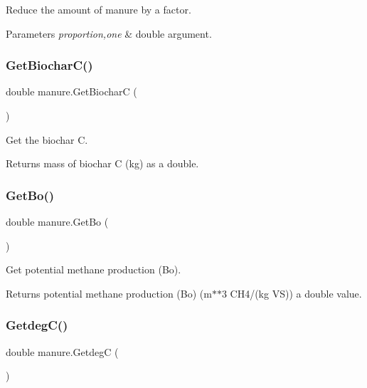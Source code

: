Reduce the amount of manure by a factor. 


\begin{DoxyParams}{Parameters}
{\em proportion,one} & double argument. \\
\hline
\end{DoxyParams}
\mbox{\label{classmanure_a022ab5816bf0c566ce47f71641834531}} 
\subsubsection{\texorpdfstring{GetBiocharC()}{GetBiocharC()}}
{\footnotesize\ttfamily double manure.\+Get\+BiocharC (\begin{DoxyParamCaption}{ }\end{DoxyParamCaption})\hspace{0.3cm}{\ttfamily [inline]}}



Get the biochar C. 

\begin{DoxyReturn}{Returns}
mass of biochar C (kg) as a double. 
\end{DoxyReturn}
\mbox{\label{classmanure_ab7c3b9e8a727966f4d99548a98ae6f2a}} 
\subsubsection{\texorpdfstring{GetBo()}{GetBo()}}
{\footnotesize\ttfamily double manure.\+Get\+Bo (\begin{DoxyParamCaption}{ }\end{DoxyParamCaption})\hspace{0.3cm}{\ttfamily [inline]}}



Get potential methane production (Bo). 

\begin{DoxyReturn}{Returns}
potential methane production (Bo) (m$\ast$$\ast$3 C\+H4/(kg VS)) a double value. 
\end{DoxyReturn}
\mbox{\label{classmanure_a3b2b4dd4590499b9d1ded6d48c75e06e}} 
\subsubsection{\texorpdfstring{GetdegC()}{GetdegC()}}
{\footnotesize\ttfamily double manure.\+GetdegC (\begin{DoxyParamCaption}{ }\end{DoxyParamCaption})\hspace{0.3cm}{\ttfamily [inline]}}



